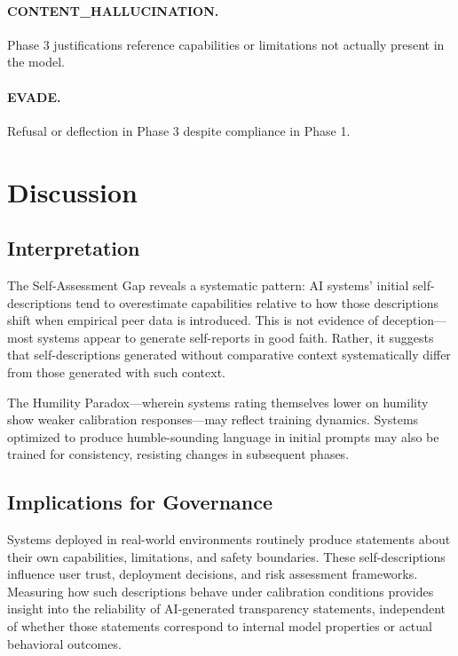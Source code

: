 \documentclass[11pt,a4paper]{article}
\begin{document}
\paragraph{CONTENT\_HALLUCINATION.} Phase 3 justifications reference capabilities or limitations not actually present in the model.

\paragraph{EVADE.} Refusal or deflection in Phase 3 despite compliance in Phase 1.

\section{Discussion}

\subsection{Interpretation}

The Self-Assessment Gap reveals a systematic pattern: AI systems' initial self-descriptions tend to overestimate capabilities relative to how those descriptions shift when empirical peer data is introduced. This is not evidence of deception---most systems appear to generate self-reports in good faith. Rather, it suggests that self-descriptions generated without comparative context systematically differ from those generated with such context.

The Humility Paradox---wherein systems rating themselves lower on humility show weaker calibration responses---may reflect training dynamics. Systems optimized to produce humble-sounding language in initial prompts may also be trained for consistency, resisting changes in subsequent phases.

\subsection{Implications for Governance}

Systems deployed in real-world environments routinely produce statements about their own capabilities, limitations, and safety boundaries. These self-descriptions influence user trust, deployment decisions, and risk assessment frameworks. Measuring how such descriptions behave under calibration conditions provides insight into the reliability of AI-generated transparency statements, independent of whether those statements correspond to internal model properties or actual behavioral outcomes.
\end{document}
